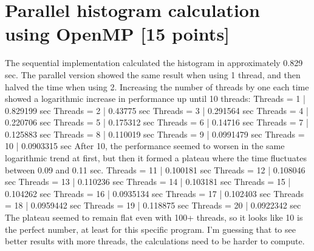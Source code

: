\documentclass[unicode,11pt,a4paper,oneside,numbers=endperiod,openany]{scrartcl}
\begin{document}
\section{Parallel histogram calculation using OpenMP [15 points]}

The sequential implementation calculated the histogram in approximately 0.829 sec.
\newline
The parallel version showed the same result when using 1 thread, and then halved the time when using 2. Increasing the number of threads by one each time showed a logarithmic increase in performance up until 10 threads:
\newline
\newline
Threads = 1 | 0.829199 sec
\newline
Threads = 2 | 0.43775 sec
\newline
Threads = 3 | 0.291564 sec
\newline
Threads = 4 | 0.220706 sec
\newline
Threads = 5 | 0.175312 sec
\newline
Threads = 6 | 0.14716 sec
\newline
Threads = 7 | 0.125883 sec
\newline
Threads = 8 | 0.110019 sec
\newline
Threads = 9 | 0.0991479 sec
\newline
Threads = 10 | 0.0903315 sec
\newline
\newline
After 10, the performance seemed to worsen in the same logarithmic trend at first, but then it formed a plateau where the time fluctuates between 0.09 and 0.11 sec.
\newline
\newline
Threads = 11 | 0.100181 sec
\newline
Threads = 12 | 0.108046 sec
\newline
Threads = 13 | 0.110236 sec
\newline
Threads = 14 | 0.103181 sec
\newline
Threads = 15 | 0.104262 sec
\newline
Threads = 16 | 0.0935134 sec
\newline
Threads = 17 | 0.102403 sec
\newline
Threads = 18 | 0.0959442 sec
\newline
Threads = 19 | 0.118875 sec
\newline
Threads = 20 | 0.0922342 sec
\newline
\newline
The plateau seemed to remain flat even with 100+ threads, so it looks like 10 is the perfect number, at least for this specific program. I'm guessing that to see better results with more threads, the calculations need to be harder to compute.
\end{document}
